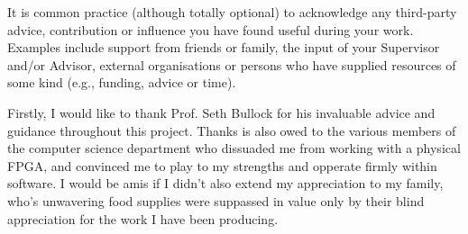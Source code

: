 \noindent
{
	\color{red}
It is common practice (although totally optional) to acknowledge any
third-party advice, contribution or influence you have found useful
during your work.  Examples include support from friends or family, 
the input of your Supervisor and/or Advisor, external organisations 
or persons who  have supplied resources of some kind (e.g., funding, 
advice or time).
}

Firstly, I would like to thank Prof. Seth Bullock for his invaluable
advice and guidance throughout this project.
Thanks is also owed to the various members of the computer science department
who dissuaded me from working with a physical FPGA, and convinced me to play to my strengths
and opperate firmly within software. I would be amis if I didn't also extend
my appreciation to my family, who's unwavering food supplies were suppassed in value only by
their blind appreciation for the work I have been producing.
